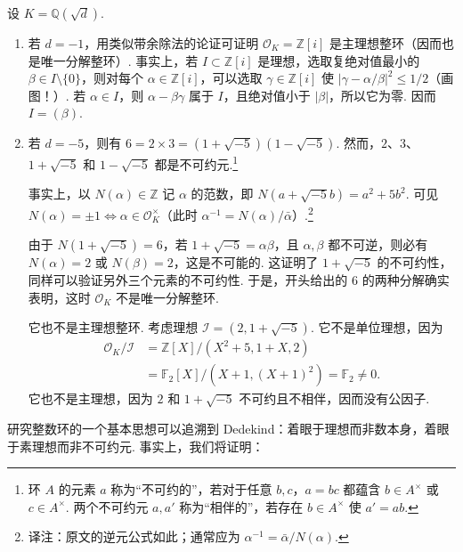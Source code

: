 \begin{example*}

设 $K=\mathbb{Q}(\sqrt d)$.

\begin{enumerate}[label=\roman*)]

\item 若 $d=-1$，用类似带余除法的论证可证明 $\mathcal O_K=\mathbb{Z}[i]$ 是主理想整环（因而也是唯一分解整环）. 事实上，若 $I\subset\mathbb{Z}[i]$ 是理想，选取复绝对值最小的 $\beta\in I\setminus\{0\}$，则对每个 $\alpha\in\mathbb{Z}[i]$，可以选取 $\gamma\in\mathbb{Z}[i]$ 使 $|\gamma-\alpha/\beta|^2\leqslant1/2$（画图！）. 若 $\alpha\in I$，则 $\alpha-\beta\gamma$ 属于 $I$，且绝对值小于 $|\beta|$，所以它为零. 因而 $I=(\beta)$.

\item 若 $d=-5$，则有 $6=2\times3=(1+\sqrt{-5})(1-\sqrt{-5})$. 然而，$2$、$3$、$1+\sqrt{-5}$ 和 $1-\sqrt{-5}$ 都是不可约元.\footnote{环 $A$ 的元素 $a$ 称为``不可约的''，若对于任意 $b,c$，$a=bc$ 都蕴含 $b\in A^\times$ 或 $c\in A^\times$. 两个不可约元 $a,a'$ 称为``相伴的''，若存在 $b\in A^\times$ 使 $a'=ab$.}

事实上，以 $N(\alpha)\in\mathbb{Z}$ 记 $\alpha$ 的范数，即 $N(a+\sqrt{-5}b)=a^2+5b^2$. 可见 $N(\alpha)=\pm1\Longleftrightarrow\alpha\in\mathcal O_K^\times$（此时 $\alpha^{-1}=N(\alpha)/\bar\alpha$）.\footnote{译注：原文的逆元公式如此；通常应为 $\alpha^{-1}=\bar\alpha/N(\alpha)$.}

由于 $N(1+\sqrt{-5})=6$，若 $1+\sqrt{-5}=\alpha\beta$，且 $\alpha,\beta$ 都不可逆，则必有 $N(\alpha)=2$ 或 $N(\beta)=2$，这是不可能的. 这证明了 $1+\sqrt{-5}$ 的不可约性，同样可以验证另外三个元素的不可约性. 于是，开头给出的 $6$ 的两种分解确实表明，这时 $\mathcal O_K$ 不是唯一分解整环.

它也不是主理想整环. 考虑理想 $\mathcal I=(2,1+\sqrt{-5})$. 它不是单位理想，因为
\begin{align*}
\mathcal O_K/\mathcal I&=\mathbb{Z}[X]/(X^2+5,1+X,2)\\
&=\mathbb{F}_2[X]/(X+1,(X+1)^2)=\mathbb{F}_2\ne0.
\end{align*}
它也不是主理想，因为 $2$ 和 $1+\sqrt{-5}$ 不可约且不相伴，因而没有公因子.

\end{enumerate}

\end{example*}

研究整数环的一个基本思想可以追溯到 Dedekind：着眼于理想而非数本身，着眼于素理想而非不可约元. 事实上，我们将证明：

